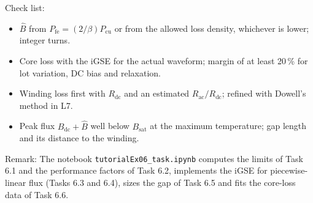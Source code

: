 
\begin{solutionblock}
	Check list:
	\begin{itemize}
		\item $\hat{B}$ from $P_\mathrm{fe}=(2/\beta)P_\mathrm{cu}$ or from the allowed loss density, whichever is lower; integer turns.
		\item Core loss with the iGSE for the actual waveform; margin of at least 20\,\% for lot variation, DC bias and relaxation.
		\item Winding loss first with $R_\mathrm{dc}$ and an estimated $R_\mathrm{ac}/R_\mathrm{dc}$; refined with Dowell's method in L7.
		\item Peak flux $B_\mathrm{dc}+\hat{B}$ well below $B_\mathrm{sat}$ at the maximum temperature; gap length and its distance to the winding.
	\end{itemize}
\end{solutionblock}

\vspace{0.5cm}
Remark: The notebook \texttt{tutorialEx06\_task.ipynb} computes the limits of Task 6.1 and the performance factors of Task 6.2, implements the iGSE for piecewise-linear flux (Tasks 6.3 and 6.4), sizes the gap of Task 6.5 and fits the core-loss data of Task 6.6.
